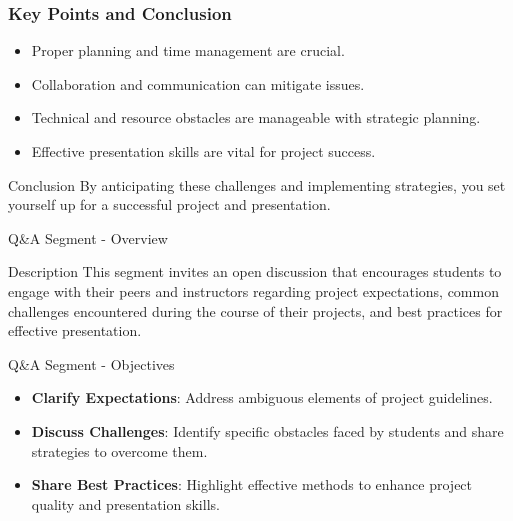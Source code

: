 \documentclass[aspectratio=169]{beamer}
\begin{document}
\begin{frame}[fragile]
    \frametitle{Key Points and Conclusion}
    \begin{itemize}
        \item Proper planning and time management are crucial.
        \item Collaboration and communication can mitigate issues.
        \item Technical and resource obstacles are manageable with strategic planning.
        \item Effective presentation skills are vital for project success.
    \end{itemize}
    \begin{block}{Conclusion}
        By anticipating these challenges and implementing strategies, you set yourself up for a successful project and presentation.
    \end{block}
\end{frame}

\begin{frame}[fragile]{Q\&A Segment - Overview}
    \begin{block}{Description}
        This segment invites an open discussion that encourages students to engage with their peers and instructors regarding project expectations, common challenges encountered during the course of their projects, and best practices for effective presentation.
    \end{block}
\end{frame}

\begin{frame}[fragile]{Q\&A Segment - Objectives}
    \begin{itemize}
        \item \textbf{Clarify Expectations}: Address ambiguous elements of project guidelines.
        \item \textbf{Discuss Challenges}: Identify specific obstacles faced by students and share strategies to overcome them.
        \item \textbf{Share Best Practices}: Highlight effective methods to enhance project quality and presentation skills.
    \end{itemize}
\end{frame}
\end{document}
